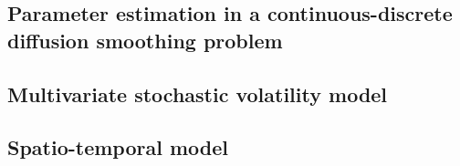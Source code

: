 

\subsection{Parameter estimation in a continuous-discrete diffusion smoothing problem}
\label{subsec:lorenz}


\subsection{Multivariate stochastic volatility model}
\label{subsec:stoch-vol}


\subsection{Spatio-temporal model}
\label{subsec:spatio-temporal}

